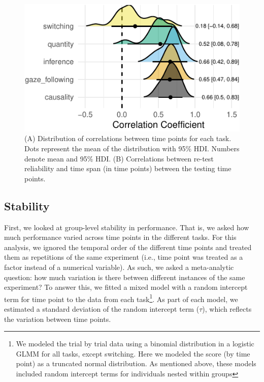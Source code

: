 \documentclass[10pt, letterpaper]{article}
\newenvironment{CodeChunk}{}{}
\begin{document}
\begin{CodeChunk}
\begin{figure}[h]

{\centering \includegraphics{figs/relplot-1} 

}

\caption[(A) Distribution of correlations between time points for each task]{(A) Distribution of correlations between time points for each task. Dots represent the mean of the distribution with 95\% HDI. Numbers denote mean and 95\% HDI. (B) Correlations between re-test reliability and time span (in time points) between the testing time points.}\label{fig:relplot}
\end{figure}
\end{CodeChunk}

\hypertarget{stability}{%
\subsection{Stability}\label{stability}}

First, we looked at group-level stability in performance. That is, we
asked how much performance varied across time points in the different
tasks. For this analysis, we ignored the temporal order of the different
time points and treated them as repetitions of the same experiment
(i.e., time point was treated as a factor instead of a numerical
variable). As such, we asked a meta-analytic question: how much
variation is there between different instances of the same experiment?
To answer this, we fitted a mixed model with a random intercept term for
time point to the data from each task\footnote{We modeled the trial by
  trial data using a binomial distribution in a logistic GLMM for all
  tasks, except switching. Here we modeled the score (by time point) as
  a truncated normal distribution. As mentioned above, these models
  included random intercept terms for individuals nested within groups}.
As part of each model, we estimated a standard deviation of the random
intercept term (\(\tau\)), which reflects the variation between time
points.
\end{document}
